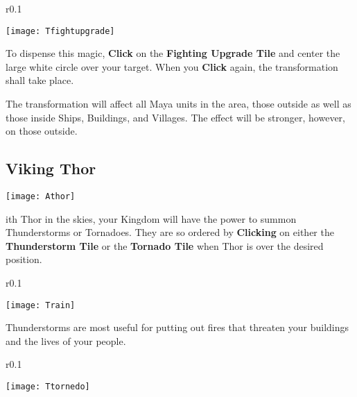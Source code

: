 \begin{wrapfigure}{r}{0.1\textwidth}
    \vspace{-20pt}
    \begin{center}
        \texttt{[image: Tfightupgrade]}
    \end{center}
    \vspace{-20pt}
\end{wrapfigure}

To dispense this magic, \textbf{Click} on the \textbf{Fighting Upgrade Tile} and center the large white circle over your target. When you \textbf{Click} again, the transformation shall take place.

The transformation will affect all Maya units in the area, those outside as well as those inside Ships, Buildings, and Villages. The effect will be stronger, however, on those outside.

\subsection{Viking Thor}


\begin{center}
    \texttt{[image: Athor]}
\end{center}

ith Thor in the skies, your Kingdom will have the power to summon Thunderstorms or Tornadoes. They are so ordered by \textbf{Clicking} on either the \textbf{Thunderstorm Tile} or the \textbf{Tornado Tile} when Thor is over the desired position.

\begin{wrapfigure}{r}{0.1\textwidth}
    \vspace{-20pt}
    \begin{center}
        \texttt{[image: Train]}
    \end{center}
    \vspace{-20pt}
\end{wrapfigure}

Thunderstorms are most useful for putting out fires that threaten your buildings and the lives of your people. \\

\begin{wrapfigure}{r}{0.1\textwidth}
    \vspace{-20pt}
    \begin{center}
        \texttt{[image: Ttornedo]}
    \end{center}
    \vspace{-20pt}
\end{wrapfigure}


